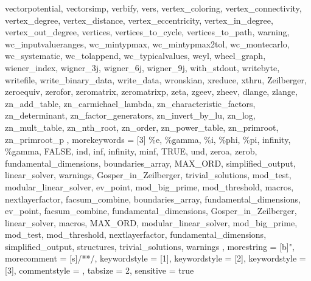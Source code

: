 {{    vectorpotential,
    vectorsimp,
    verbify,
    vers,
    vertex_coloring,
    vertex_connectivity,
    vertex_degree,
    vertex_distance,
    vertex_eccentricity,
    vertex_in_degree,
    vertex_out_degree,
    vertices,
    vertices_to_cycle,
    vertices_to_path,
    warning,
    wc_inputvalueranges,
    wc_mintypmax,
    wc_mintypmax2tol,
    wc_montecarlo,
    wc_systematic,
    wc_tolappend,
    wc_typicalvalues,
    weyl,
    wheel_graph,
    wiener_index,
    wigner_3j,
    wigner_6j,
    wigner_9j,
    with_stdout,
    writebyte,
    writefile,
    write_binary_data,
    write_data,
    wronskian,
    xreduce,
    xthru,
    Zeilberger,
    zeroequiv,
    zerofor,
    zeromatrix,
    zeromatrixp,
    zeta,
    zgeev,
    zheev,
    dlange,
    zlange,
    zn_add_table,
    zn_carmichael_lambda,
    zn_characteristic_factors,
    zn_determinant,
    zn_factor_generators,
    zn_invert_by_lu,
    zn_log,
    zn_mult_table,
    zn_nth_root,
    zn_order,
    zn_power_table,
    zn_primroot,
    zn_primroot_p
  },
  morekeywords = [3]{
    \%e,
    \%gamma,
    \%i,
    \%phi,
    \%pi,
    infinity,
    \%gamma,
    FALSE,
    ind,
    inf,
    infinity,
    minf,
    TRUE,
    und,
    zeroa,
    zerob,
    fundamental_dimensions,
    boundaries_array,
    MAX_ORD,
    simplified_output,
    linear_solver,
    warnings,
    Gosper_in_Zeilberger,
    trivial_solutions,
    mod_test,
    modular_linear_solver,
    ev_point,
    mod_big_prime,
    mod_threshold,
    macros,
    nextlayerfactor,
    facsum_combine,
    boundaries_array,
    fundamental_dimensions,
    ev_point,
    facsum_combine,
    fundamental_dimensions,
    Gosper_in_Zeilberger,
    linear_solver,
    macros,
    MAX_ORD,
    modular_linear_solver,
    mod_big_prime,
    mod_test,
    mod_threshold,
    nextlayerfactor,
    fundamental_dimensions,
    simplified_output,
    structures,
    trivial_solutions,
    warnings
  },
  morestring = [b]",
  morecomment = [s]{/*}{*/},
  keywordstyle = [1]\color{blue},
  keywordstyle = [2]\color{RedViolet},
  keywordstyle = [3]\color{Fuchsia},
  commentstyle = \color{comment-green},
  tabsize = 2,
  sensitive = true
}

\makeatletter
{}
\makeatother

\usepackage{bbding}
\newcommand{\outline}[1]{\noindent \textcolor{blue}{\NibSolidRight\;#1}}
\usepackage{fontawesome}
\newcommand{\draft}[1]{\noindent \textcolor{comment-green}{\faCommenting\;#1}}
\newcommand{\todo}[1]{\noindent \textcolor{red}{\faCalendar\;#1}}

